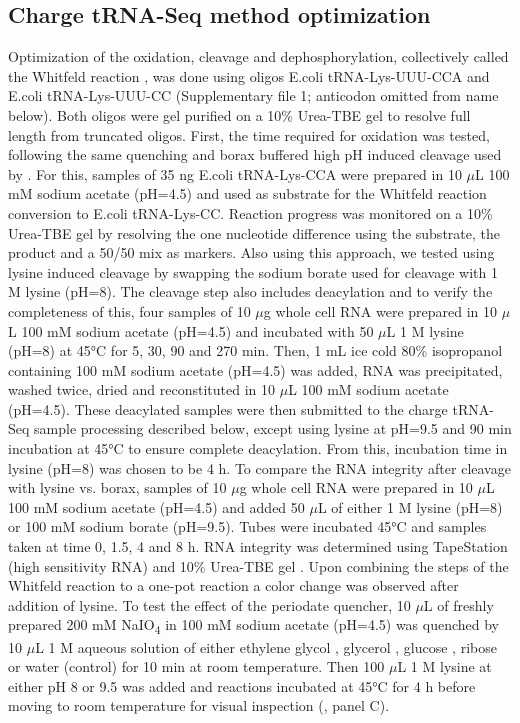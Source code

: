 \documentclass[9pt,lineno]{elife}
\begin{document}
\subsection{Charge tRNA-Seq method optimization}
Optimization of the oxidation, cleavage and dephosphorylation, collectively called the Whitfeld reaction \citep{Whitfeld1953-ca}, was done using oligos E.coli tRNA-Lys-UUU-CCA and E.coli tRNA-Lys-UUU-CC (Supplementary file 1; anticodon omitted from name below).
Both oligos were gel purified on a 10\% Urea-TBE gel to resolve full length from truncated oligos.
First, the time required for oxidation was tested, following the same quenching and borax buffered high pH induced cleavage used by \cite{Evans2017-st}.
For this, samples of 35 ng E.coli tRNA-Lys-CCA were prepared in 10 $\mu$L 100 mM sodium acetate (pH=4.5) and used as substrate for the Whitfeld reaction conversion to E.coli tRNA-Lys-CC.
Reaction progress was monitored on a 10\% Urea-TBE gel by resolving the one nucleotide difference using the substrate, the product and a 50/50 mix as markers.
Also using this approach, we tested using lysine induced cleavage \citep{Khym1961-xf} by swapping the sodium borate used for cleavage with 1 M lysine (pH=8).
The cleavage step also includes deacylation and to verify the completeness of this, four samples of 10 $\mu$g whole cell RNA were prepared in 10 $\mu$L 100 mM sodium acetate (pH=4.5) and incubated with 50 $\mu$L 1 M lysine (pH=8) at 45°C for 5, 30, 90 and 270 min.
Then, 1 mL ice cold 80\% isopropanol containing 100 mM sodium acetate (pH=4.5) was added, RNA was precipitated, washed twice, dried and reconstituted in 10 $\mu$L 100 mM sodium acetate (pH=4.5).
These deacylated samples were then submitted to the charge tRNA-Seq sample processing described below, except using lysine at pH=9.5 and 90 min incubation at 45°C to ensure complete deacylation.
From this, incubation time in lysine (pH=8) was chosen to be 4 h.
To compare the RNA integrity after cleavage with lysine vs. borax, samples of 10 $\mu$g whole cell RNA were prepared in 10 $\mu$L 100 mM sodium acetate (pH=4.5) and added 50 $\mu$L of either 1 M lysine (pH=8) or 100 mM sodium borate (pH=9.5).
Tubes were incubated 45°C and samples taken at time 0, 1.5, 4 and 8 h.
RNA integrity was determined using TapeStation (high sensitivity RNA) and 10\% Urea-TBE gel .
Upon combining the steps of the Whitfeld reaction to a one-pot reaction a color change was observed after addition of lysine.
To test the effect of the periodate quencher, 10 $\mu$L of freshly prepared 200 mM NaIO\textsubscript{4} in 100 mM sodium acetate (pH=4.5) was quenched by 10 $\mu$L 1 M aqueous solution of either 
ethylene glycol \citep{Neu1964-hu}, glycerol \citep{Alefelder1998-ln}, glucose \citep{Evans2017-st}, ribose \citep{Watkins2022-er} or water (control) for 10 min at room temperature.
Then 100 $\mu$L 1 M lysine at either pH 8 or 9.5 was added and reactions incubated at 45°C for 4 h before moving to room temperature for visual inspection (, panel C).
\end{document}
